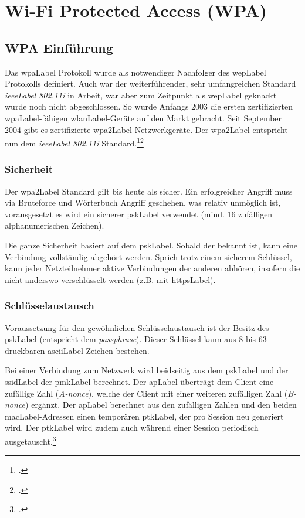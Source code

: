 \chapter{Wi-Fi Protected Access (WPA)}
\label{ch:wpa}


\section{WPA Einführung}
Das \gls{wpaLabel} Protokoll wurde als notwendiger Nachfolger des \gls{wepLabel} Protokolls definiert.
Auch war der weiterführender, sehr umfangreichen Standard \textit{\gls{ieeeLabel} 802.11i} in Arbeit, war aber zum Zeitpunkt als \gls{wepLabel} geknackt wurde noch nicht abgeschlossen. So wurde Anfangs 2003 die ersten zertifizierten \gls{wpaLabel}-fähigen \gls{wlanLabel}-Geräte auf den Markt gebracht.
Seit September 2004 gibt es zertifizierte \gls{wpa2Label} Netzwerkgeräte. Der \gls{wpa2Label} entspricht nun dem \textit{\gls{ieeeLabel} 802.11i} Standard.\footcite{Wi-Fi_Protected_Access__Wikipedia_2015-04-10}\footcite{WPA2__Wikipedia_2015-04-10}

\subsection{Sicherheit}
Der \gls{wpa2Label} Standard gilt bis heute als sicher.
Ein erfolgreicher Angriff muss via Bruteforce und Wörterbuch Angriff geschehen, was relativ unmöglich ist, vorausgesetzt es wird ein sicherer \gls{pskLabel} verwendet (mind. 16 zufälligen alphanumerischen Zeichen).

Die ganze Sicherheit basiert auf dem \gls{pskLabel}.
Sobald der bekannt ist, kann eine Verbindung vollständig abgehört werden.
Sprich trotz einem sicherem Schlüssel, kann jeder Netzteilnehmer aktive Verbindungen der anderen abhören, insofern die nicht anderswo verschlüsselt werden (z.B. mit \gls{httpsLabel}).


\subsection{Schlüsselaustausch}
Voraussetzung für den gewöhnlichen Schlüsselaustausch ist der Besitz des \gls{pskLabel} (entspricht dem \textit{passphrase}).
Dieser Schlüssel kann aus 8 bis 63 druckbaren \gls{asciiLabel} Zeichen bestehen.

Bei einer Verbindung zum Netzwerk wird beidseitig aus dem \gls{pskLabel} und der \gls{ssidLabel} der \gls{pmkLabel} berechnet.
Der \gls{apLabel} überträgt dem Client eine zufällige Zahl (\textit{A-nonce}), welche der Client mit einer weiteren zufälligen Zahl (\textit{B-nonce}) ergänzt.
Der \gls{apLabel} berechnet aus den zufälligen Zahlen und den beiden \gls{macLabel}-Adressen einen temporären \gls{ptkLabel}, der pro Session neu generiert wird. Der \gls{ptkLabel} wird zudem auch während einer Session periodisch ausgetauscht.\footcite[][40f.]{WrightCache201503}

